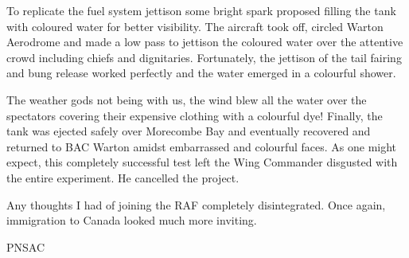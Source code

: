 To replicate the fuel system jettison some bright spark proposed
filling the tank with coloured water for better visibility. The
aircraft took off, circled Warton Aerodrome and made a low pass to
jettison the coloured water over the attentive crowd including chiefs
and dignitaries. Fortunately, the jettison of the tail fairing and
bung release worked perfectly and the water emerged in a colourful
shower.  

The weather gods not being with us, the wind blew all the water over
the spectators covering their expensive clothing with a colourful dye!
Finally, the tank was ejected safely over Morecombe Bay and eventually
recovered and returned to BAC Warton amidst embarrassed and colourful
faces. As one might expect, this completely successful test left the
Wing Commander disgusted with the entire experiment. He cancelled the
project.

Any thoughts I had of joining the RAF completely disintegrated. Once
again, immigration to Canada looked much more inviting.

\begin{footnotesize}
    \raggedleft PNSAC\\
\end{footnotesize}



